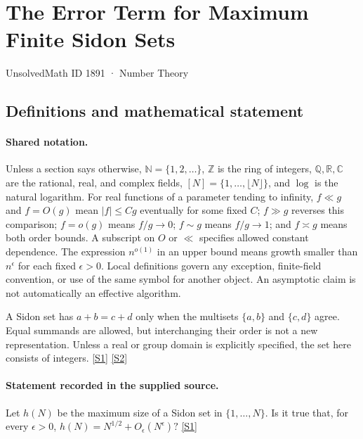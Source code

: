 \documentclass[11pt,a4paper]{article}
\newcommand{\N}{\mathbb{N}}
\newcommand{\Z}{\mathbb{Z}}
\newcommand{\Q}{\mathbb{Q}}
\newcommand{\R}{\mathbb{R}}
\newcommand{\C}{\mathbb{C}}
\newcommand{\sref}[2]{\hyperlink{source:#1:#2}{[S#2]}}
\begin{document}

\setcounter{section}{1890}

\section{The Error Term for Maximum Finite Sidon Sets}\label{1891}

{\small\sffamily UnsolvedMath ID 1891 · Number Theory}

\subsection{Definitions and mathematical statement}

\paragraph{Shared notation.}Unless a section says otherwise, $\N=\{1,2,\ldots\}$,
$\Z$ is the ring of integers, $\Q,\R,\C$ are the rational, real, and complex
fields, $[N]=\{1,\ldots,\lfloor N\rfloor\}$, and $\log$ is the natural
logarithm. For real functions of a parameter tending to infinity,
$f\ll g$ and $f=O(g)$ mean $|f|\leq Cg$ eventually for some fixed $C$;
$f\gg g$ reverses this comparison; $f=o(g)$ means $f/g\to0$;
$f\sim g$ means $f/g\to1$; and $f\asymp g$ means both order bounds.
A subscript on $O$ or $\ll$ specifies allowed constant dependence.
The expression $n^{o(1)}$ in an upper bound means growth smaller than
$n^\epsilon$ for each fixed $\epsilon>0$. Local definitions govern any
exception, finite-field convention, or use of the same symbol for another
object. An asymptotic claim is not automatically an effective algorithm.



A Sidon set has $a+b=c+d$ only when the multisets $\{a,b\}$ and $\{c,d\}$ agree. Equal summands are allowed, but interchanging their order is not a new representation. Unless a real or group domain is explicitly specified, the set here consists of integers. \sref{1891}{1} \sref{1891}{2}

\paragraph{Statement recorded in the supplied source.}
Let $h(N)$ be the maximum size of a Sidon set in $\{1,\ldots,N\}$. Is it true that, for every $\epsilon>0$, $ h(N) = N^{1/2}+O_\epsilon(N^\epsilon)? $ \sref{1891}{1}
\end{document}
